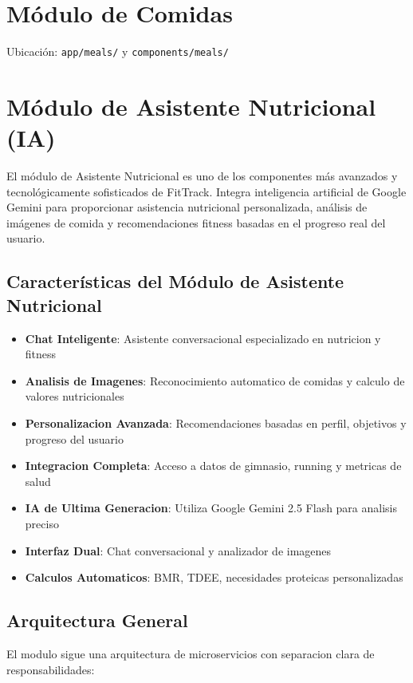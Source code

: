 \documentclass[12pt,a4paper]{article}
\begin{document}
\section{Módulo de Comidas}

Ubicación: \texttt{app/meals/} y \texttt{components/meals/}

\section{Módulo de Asistente Nutricional (IA)}

El módulo de Asistente Nutricional es uno de los componentes más avanzados y tecnológicamente sofisticados de FitTrack. Integra inteligencia artificial de Google Gemini para proporcionar asistencia nutricional personalizada, análisis de imágenes de comida y recomendaciones fitness basadas en el progreso real del usuario.

\subsection{Características del Módulo de Asistente Nutricional}

\begin{itemize}
    \item \textbf{Chat Inteligente}: Asistente conversacional especializado en nutricion y fitness
    \item \textbf{Analisis de Imagenes}: Reconocimiento automatico de comidas y calculo de valores nutricionales
    \item \textbf{Personalizacion Avanzada}: Recomendaciones basadas en perfil, objetivos y progreso del usuario
    \item \textbf{Integracion Completa}: Acceso a datos de gimnasio, running y metricas de salud
    \item \textbf{IA de Ultima Generacion}: Utiliza Google Gemini 2.5 Flash para analisis preciso
    \item \textbf{Interfaz Dual}: Chat conversacional y analizador de imagenes
    \item \textbf{Calculos Automaticos}: BMR, TDEE, necesidades proteicas personalizadas
\end{itemize}

\subsection{Arquitectura General}

El modulo sigue una arquitectura de microservicios con separacion clara de responsabilidades:
\end{document}
